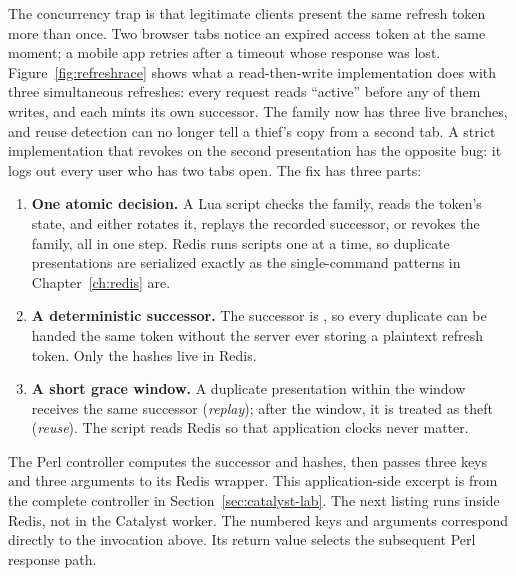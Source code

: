 The concurrency trap is that legitimate clients present the same refresh token more than once. Two browser tabs notice an expired access token at the same moment; a mobile app retries after a timeout whose response was lost. Figure~\ref{fig:refreshrace} shows what a read-then-write implementation does with three simultaneous refreshes: every request reads ``active'' before any of them writes, and each mints its own successor. The family now has three live branches, and reuse detection can no longer tell a thief's copy from a second tab. A strict implementation that revokes on the second presentation has the opposite bug: it logs out every user who has two tabs open.
The fix has three parts:
\begin{enumerate}
\item \textbf{One atomic decision.} A Lua script checks the family, reads the token's state, and either rotates it, replays the recorded successor, or revokes the family, all in one step. Redis runs scripts one at a time, so duplicate presentations are serialized exactly as the single-command patterns in Chapter~\ref{ch:redis} are.
\item \textbf{A deterministic successor.} The successor is , so every duplicate can be handed the same token without the server ever storing a plaintext refresh token. Only the hashes live in Redis.
\item \textbf{A short grace window.} A duplicate presentation within the window receives the same successor (\emph{replay}); after the window, it is treated as theft (\emph{reuse}). The script reads Redis  so that application clocks never matter.
\end{enumerate}
The Perl controller computes the successor and hashes, then passes three keys and three arguments to its Redis wrapper. This application-side excerpt is from the complete controller in Section~\ref{sec:catalyst-lab}.
The next listing runs inside Redis, not in the Catalyst worker. The numbered keys and arguments correspond directly to the invocation above. Its return value selects the subsequent Perl response path.
